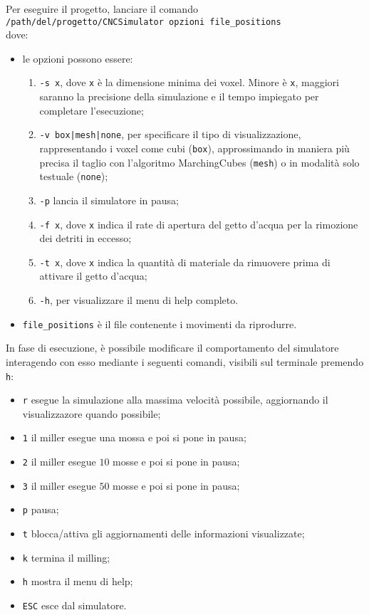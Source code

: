 Per eseguire il progetto, lanciare il comando\\ \verb!/path/del/progetto/CNCSimulator opzioni file_positions!\\ dove:
\begin{itemize}
  \item le opzioni possono essere:
    \begin{enumerate}[noitemsep]
      \item \verb!-s x!, dove \verb!x! è la dimensione minima dei voxel. Minore è \verb!x!, maggiori saranno la precisione della simulazione e il tempo impiegato per completare l'esecuzione;
      \item \verb!-v box|mesh|none!, per specificare il tipo di visualizzazione, rappresentando i voxel come cubi (\texttt{box}), approssimando in maniera più precisa il taglio con l'algoritmo MarchingCubes (\texttt{mesh}) o in modalità solo testuale (\texttt{none});
      \item \verb!-p! lancia il simulatore in pausa;
      \item \verb!-f x!, dove \verb!x! indica il rate di apertura del getto d'acqua per la rimozione dei detriti in eccesso;
      \item \verb!-t x!, dove \verb!x! indica la quantità di materiale da rimuovere prima di attivare il getto d'acqua;
      \item \verb!-h!, per visualizzare il menu di help completo.
    \end{enumerate}
  \item \verb!file_positions! è il file contenente i movimenti da riprodurre.
\end{itemize}

In fase di esecuzione, è possibile modificare il comportamento del simulatore interagendo con esso mediante i seguenti comandi, visibili sul terminale premendo \texttt{h}:
\begin{itemize}[noitemsep]
  \item \verb'r'		esegue la simulazione alla massima velocità possibile, aggiornando il visualizzazore quando possibile;
  \item \verb'1'		il miller esegue una mossa e poi si pone in pausa;
  \item \verb'2'		il miller esegue $10$ mosse e poi si pone in pausa;
  \item \verb'3'		il miller esegue $50$ mosse e poi si pone in pausa;
  \item \verb'p'		pausa;
  \item \verb't'		blocca/attiva gli aggiornamenti delle informazioni visualizzate;
  \item \verb'k'		termina il milling;
  \item \verb'h'		mostra il menu di help;
  \item \verb'ESC'	esce dal simulatore.
\end{itemize}
